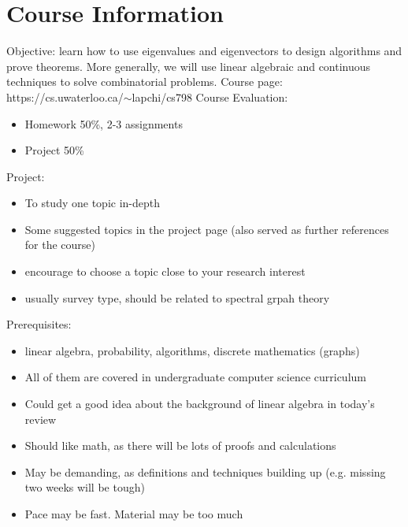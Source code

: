 \documentclass[11pt,a4paper]{report}
\newenvironment{courseeval}[1][default]
	{#1 \begin{minipage}[t]{\linewidth}\begin{itemize}}
	{\end{itemize}\end{minipage}}
\begin{document}
\section{Course Information}
Objective: learn how to use eigenvalues and eigenvectors to design algorithms and prove theorems. More generally, we will use linear algebraic and continuous techniques to solve combinatorial problems.
\newline\newline
Course page: https://cs.uwaterloo.ca/$\sim$lapchi/cs798
\newline\newline
\begin{courseeval}[Course Evaluation:]
	\setlength\itemsep{0.01em}
	\item Homework 50\%, 2-3 assignments
	\item Project 50\%
\end{courseeval}
\newline\newline
\begin{courseeval}[Project:]
	\setlength\itemsep{0.01em}
	\item To study one topic in-depth
	\item Some suggested topics in the project page (also served as further references for the course)
	\item encourage to choose a topic close to your research interest
	\item usually survey type, should be related to spectral grpah theory
\end{courseeval}
\newline\newline
\begin{courseeval}[Prerequisites:]
	\setlength\itemsep{0.01em}
	\item[] linear algebra, probability, algorithms, discrete mathematics (graphs)
	\item[] All of them are covered in undergraduate computer science curriculum
	\item[] Could get a good idea about the background of linear algebra in today's review
	\item[] Should like math, as there will be lots of proofs and calculations
	\item[] May be demanding, as definitions and techniques building up (e.g. missing two weeks will be tough)
	\item[] Pace may be fast. Material may be too much
\end{courseeval}
\end{document}
